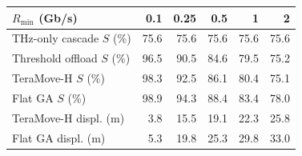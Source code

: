 \begin{tabular}{@{}lrrrrr@{}}
\toprule
$R_{\min}$ (Gb/s) & 0.1 & 0.25 & 0.5 & 1 & 2 \\
\midrule
THz-only cascade $S$ (\%) & 75.6 & 75.6 & 75.6 & 75.6 & 75.6 \\
Threshold offload $S$ (\%) & 96.5 & 90.5 & 84.6 & 79.5 & 75.2 \\
TeraMove-H $S$ (\%) & 98.3 & 92.5 & 86.1 & 80.4 & 75.1 \\
Flat GA $S$ (\%) & 98.9 & 94.3 & 88.4 & 83.4 & 78.0 \\
TeraMove-H displ. (m) & 3.8 & 15.5 & 19.1 & 22.3 & 25.8 \\
Flat GA displ. (m) & 5.3 & 19.8 & 25.3 & 29.8 & 33.0 \\
\bottomrule
\end{tabular}
